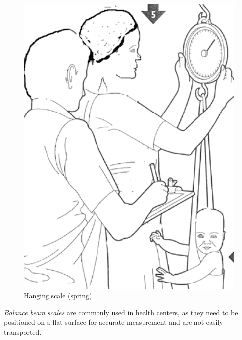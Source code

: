 \documentclass[12pt,]{book}
\theoremstyle{definition}
\theoremstyle{definition}
\theoremstyle{definition}
\theoremstyle{remark}
\begin{document}
\begin{figure}

{\centering \includegraphics[width=5.08in]{images/hangingScale} 

}

\caption{Hanging scale (spring)}\label{fig:weight2}
\end{figure}

\emph{Balance beam scales} are commonly used in health centers, as they
need to be positioned on a flat surface for accurate measurement and are
not easily transported.
\end{document}
